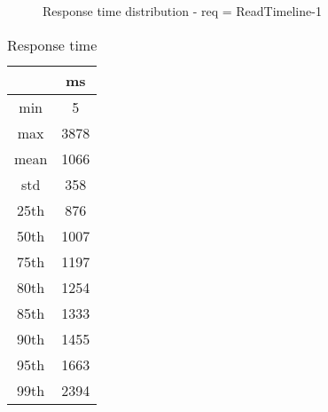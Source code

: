 \begin{minipage}{0.75\linewidth}
\begin{figure}[h]
\begin{adjustbox}{max width=1.0\linewidth, keepaspectratio}
  \end{adjustbox}
  \caption{Response time distribution - req = ReadTimeline-1}
\end{figure}
\end{minipage}\hfill\begin{minipage}{0.18\linewidth}
\begin{table}[h]
\begin{tabular}{|cc|}
\hline
\textbf{} & \textbf{ms}\\ \hline
 \Xhline{0.005\arrayrulewidth}
min & 5\\
 \Xhline{0.005\arrayrulewidth}
max & 3878\\
 \Xhline{0.005\arrayrulewidth}
mean & 1066\\
 \Xhline{0.005\arrayrulewidth}
std & 358\\
\hline
\hline
 \Xhline{0.005\arrayrulewidth}
25th & 876\\
 \Xhline{0.005\arrayrulewidth}
50th & 1007\\
 \Xhline{0.005\arrayrulewidth}
75th & 1197\\
 \Xhline{0.005\arrayrulewidth}
80th & 1254\\
 \Xhline{0.005\arrayrulewidth}
85th & 1333\\
 \Xhline{0.005\arrayrulewidth}
90th & 1455\\
 \Xhline{0.005\arrayrulewidth}
95th & 1663\\
 \Xhline{0.005\arrayrulewidth}
99th & 2394\\
\hline
\end{tabular}
\caption{Response time}
\end{table}
\end{minipage}\hfill